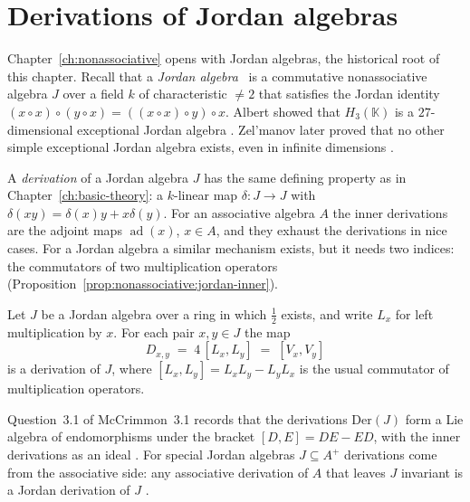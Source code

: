 \section{Derivations of Jordan algebras}\label{sec:nonassociative:jordan-algebras}

Chapter~\ref{ch:nonassociative} opens with Jordan algebras, the historical
root of this chapter. Recall that a \emph{Jordan algebra}~\cite[Section~2.4, p.~57]{McCrimmon2004Taste} is a commutative
nonassociative algebra $J$ over a field $k$ of characteristic $\neq 2$
that satisfies the Jordan identity $(x\circ x)\circ(y\circ x) =
((x\circ x)\circ y)\circ x$. Albert showed that
$H_3(\mathbb{K})$ is a $27$-dimensional exceptional Jordan algebra
\cite[p.~971]{McCrimmon2004Taste}. Zel'manov later proved that no
other simple exceptional Jordan algebra exists, even in infinite
dimensions \cite[pp.~103--111]{Zelmanov1979Prime}.

A \emph{derivation} of a Jordan algebra $J$ has the same defining
property as in Chapter~\ref{ch:basic-theory}: a $k$-linear map
$\delta\colon J\to J$ with $\delta(xy)=\delta(x)y+x\delta(y)$. For an
associative algebra $A$ the inner derivations are the adjoint maps
$\operatorname{ad}(x)$, $x\in A$, and they exhaust the derivations in
nice cases. For a Jordan algebra a similar mechanism exists, but it
needs two indices: the commutators of two multiplication operators (Proposition~\ref{prop:nonassociative:jordan-inner}).

\begin{proposition}
\label{prop:nonassociative:jordan-inner}
Let $J$ be a Jordan algebra over a ring in which $\tfrac{1}{2}$ exists,
and write $L_x$ for left multiplication by $x$. For each pair $x,y\in J$
the map
\[
D_{x,y}\;=\;4\,[L_x,L_y]\;=\;[V_x,V_y]
\]
is a derivation of $J$, where $[L_x,L_y]=L_xL_y-L_yL_x$ is the usual
commutator of multiplication operators.
\end{proposition}

Question~3.1 of McCrimmon~3.1 records that the derivations
$\mathrm{Der}(J)$ form a Lie algebra of endomorphisms under the bracket
$[D,E]=DE-ED$, with the inner derivations as an ideal
\cite[Question~3.1, p.~185]{McCrimmon2004Taste}. For special Jordan
algebras $J\subseteq A^{+}$ derivations come from the associative side:
any associative derivation of $A$ that leaves $J$ invariant is a Jordan
derivation of $J$ \cite[Problem~3.6~(2), p.~185]{McCrimmon2004Taste}.

